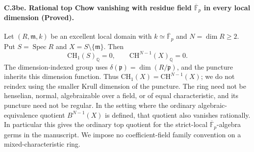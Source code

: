 \paragraph{C.3be. Rational top Chow vanishing with residue field
\(\overline{\mathbb F}_p\) in every local dimension (Proved).}
Let \((R,\mathfrak m,k)\) be an excellent local domain
with \(k\simeq\overline{\mathbb F}_p\) and \(N=\dim R\geq2\).
Put \(S=\operatorname{Spec}R\) and
\(X=S\setminus\{\mathfrak m\}\). Then
\begin{equation}\label{eq:C3be-top-vanishing}
              \mathrm{CH}_1(S)_{\mathbb Q}=0,
              \qquad \mathrm{CH}^{N-1}(X)_{\mathbb Q}=0.
\end{equation}
The dimension-indexed group uses
\(\delta(\mathfrak p)=\dim(R/\mathfrak p)\), and the puncture
inherits this dimension function. Thus
\(\mathrm{CH}_1(X)=\mathrm{CH}^{N-1}(X)\); we do not reindex
using the smaller Krull dimension of the puncture.
The ring need not be henselian, normal, algebraizable over a field, or of
equal characteristic, and its puncture need not be regular.
In the setting where the ordinary algebraic-equivalence quotient
\(B^{N-1}(X)\) is defined, that quotient also vanishes rationally.
In particular this gives the ordinary top quotient for the
strict-local \(\overline{\mathbb F}_p\)-algebra germs in the
manuscript. We impose no coefficient-field family convention on
a mixed-characteristic ring.

